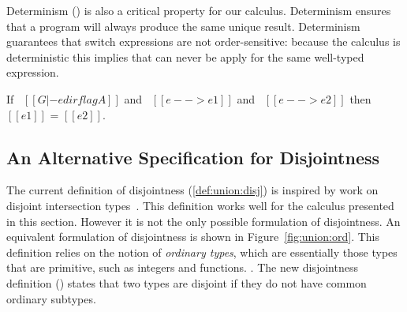 Determinism () is also a
critical property for our calculus. Determinism ensures that a program will always
produce the same unique result.
Determinism guarantees that switch expressions are not order-sensitive:
because the calculus is deterministic this implies that 
can never be apply for the same well-typed expression. 

\begin{lemma}[Determinism]
\label{lemma:union:determinism}
  If \ $[[G |- e dirflag A]]$ and \ $[[e --> e1]]$ and \ $[[e --> e2]]$ then $[[e1]]$ = $[[e2]]$.
\end{lemma}

\begin{comment}
\begin{proof}
  By induction on first reduction relation and inverting second reduction relation subsequently.
  All cases are trivial to solve by simple inversions except:
  \begin{itemize}
    \item Case \rref{typ-typeof} requires \cref{lemma:union:check-both-disj-false}.
  \end{itemize}
\end{proof}

\begin{lemma}[check-both-disj-false]
\label{lemma:union:check-both-disj-false}
If \ $[[A *s B]]$ \ and \ $[[G |- p <= A]]$ \ and \ $[[G |- p <= B]]$ \ then \ False.
\end{lemma}
\end{comment}


\subsection{An Alternative Specification for Disjointness}
\label{sec:union:discussion}
The current definition of disjointness (\cref{def:union:disj}) is inspired
by work on disjoint intersection types~\cite{}. This definition works well
for the calculus presented in this section. However it is not the only
possible formulation of disjointness.
An equivalent formulation of disjointness is shown in Figure~\ref{fig:union:ord}.
This definition relies on the notion of \emph{ordinary types}, which are essentially
those types that are primitive, such as integers and functions.
.
The new disjointness definition () states that two
types are disjoint if they do not have common ordinary subtypes.

